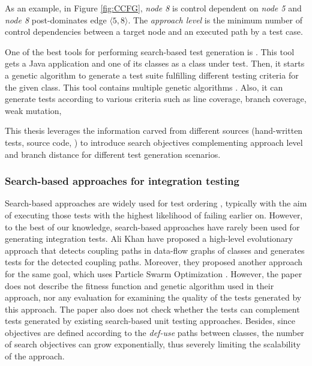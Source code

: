 %
As an example, in Figure \ref{fig:CCFG}, \textit{node 8} is control dependent on \textit{node 5} and \textit{node 8} post-dominates edge $\langle 5,8\rangle$. %
The \textit{approach level} is the minimum number of control dependencies between a target node and an executed path by a test case. 

One of the best tools for performing search-based test generation is \evosuite \cite{panichella2020evosuite}. This tool gets a Java application and one of its classes as a class under test. Then, it starts a genetic algorithm to generate a test suite fulfilling different testing criteria for the given class. This tool contains multiple  genetic algorithms \cite{fraser2012whole,Panichella2018}. Also, it can generate tests according to various criteria such as line coverage, branch coverage, weak mutation, \etc

This thesis leverages the information carved from different sources (\eg hand-written tests, source code, \etc) to introduce search objectives complementing approach level and branch distance for different test generation scenarios. 

\subsubsection{Search-based approaches for integration testing}

Search-based approaches are widely used for test ordering \cite{Wang2010, Steindl2012, Hashim2005, Vergilio2012, Bansal2009, JIiang2019, Borner2009, Mariani2016, Guizzo2015, Abdurazik2009, DaVeigaCabral2010, Briand2003a, Vergilio2012}, typically with the aim of executing those tests with the highest likelihood of failing earlier on. %
However, to the best of our knowledge, search-based approaches have rarely been used for generating integration tests. Ali Khan \etal \cite{AliKhan2013} have proposed a high-level evolutionary approach that detects coupling paths in data-flow graphs of classes and generates tests for the detected coupling paths. Moreover, they proposed another approach for the same goal, which uses Particle Swarm Optimization \cite{Khan2014}. However, the paper does not describe the fitness function and genetic algorithm used in their approach, nor any evaluation for examining the quality of the tests generated by this approach. 
The paper also does not check whether the tests can complement tests generated by existing search-based unit testing approaches. Besides, since objectives are defined according to the \textit{def-use} paths between classes, the number of search objectives can grow exponentially, thus severely limiting the scalability of the approach.

